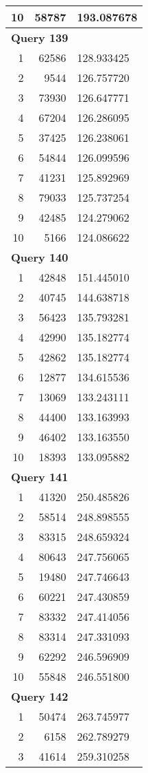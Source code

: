 \begin{longtable}[{p}]{@{}rrp{}@{}}
10 & 58787 & 193.087678 \\
\midrule
\multicolumn{3}{l}{\bfseries Query 139} \\
1 & 62586 & 128.933425 \\
2 & 9544 & 126.757720 \\
3 & 73930 & 126.647771 \\
4 & 67204 & 126.286095 \\
5 & 37425 & 126.238061 \\
6 & 54844 & 126.099596 \\
7 & 41231 & 125.892969 \\
8 & 79033 & 125.737254 \\
9 & 42485 & 124.279062 \\
10 & 5166 & 124.086622 \\
\midrule
\multicolumn{3}{l}{\bfseries Query 140} \\
1 & 42848 & 151.445010 \\
2 & 40745 & 144.638718 \\
3 & 56423 & 135.793281 \\
4 & 42990 & 135.182774 \\
5 & 42862 & 135.182774 \\
6 & 12877 & 134.615536 \\
7 & 13069 & 133.243111 \\
8 & 44400 & 133.163993 \\
9 & 46402 & 133.163550 \\
10 & 18393 & 133.095882 \\
\midrule
\multicolumn{3}{l}{\bfseries Query 141} \\
1 & 41320 & 250.485826 \\
2 & 58514 & 248.898555 \\
3 & 83315 & 248.659324 \\
4 & 80643 & 247.756065 \\
5 & 19480 & 247.746643 \\
6 & 60221 & 247.430859 \\
7 & 83332 & 247.414056 \\
8 & 83314 & 247.331093 \\
9 & 62292 & 246.596909 \\
10 & 55848 & 246.551800 \\
\midrule
\multicolumn{3}{l}{\bfseries Query 142} \\
1 & 50474 & 263.745977 \\
2 & 6158 & 262.789279 \\
3 & 41614 & 259.310258 \\

\end{longtable}
